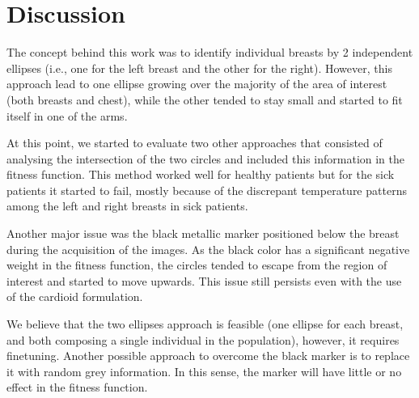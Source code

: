 \documentclass[conference]{IEEEtran}
\begin{document}

\section{Discussion}
\label{sec:discussion}

The concept behind this work was to identify individual breasts by 2 independent ellipses (i.e., one for the left breast and the other for the right). However, this approach lead to one ellipse growing over the majority of the area of interest (both breasts and chest), while the other tended to stay small and started to fit itself in one of the arms. 

At this point, we started to evaluate two other approaches that consisted of analysing the intersection of the two circles and included this information in the fitness function. This method worked well for healthy patients but for the sick patients it started to fail, mostly because of the discrepant temperature patterns among the left and right breasts in sick patients.


Another major issue was the black metallic marker positioned below the breast during the acquisition of the images. As the black color has a significant negative weight in the fitness function, the circles tended to escape from the region of interest and started to move upwards. This issue still persists even with the use of the cardioid formulation.

We believe that the two ellipses approach is feasible (one ellipse for each breast, and both composing a single individual in the population), however, it requires finetuning. Another possible approach to overcome the black marker is to replace it with random grey information. In this sense, the marker will have little or no effect in the fitness function.
\end{document}
